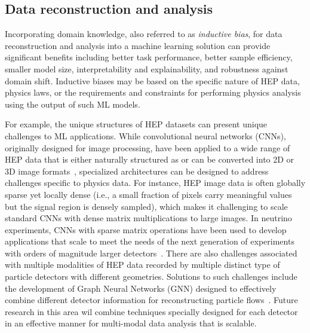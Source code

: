 \documentclass[submission,Phys]{SciPost}
\begin{document}
\subsection{Data reconstruction and analysis}


Incorporating domain knowledge, also referred to as {\it inductive bias}, for data reconstruction and analysis into a machine learning solution can provide significant benefits including better task performance, better sample efficiency, smaller model size, interpretability and explainability, and robustness against domain shift.  Inductive biases may be based on the specific nature of HEP data,  physics laws, or the requirements and constraints for performing physics analysis using the output of such ML models.

For example, the unique structures of HEP datasets can present unique challenges to ML applications. While convolutional neural networks (CNNs), originally designed for image processing, have been applied to a wide range of HEP data that is either naturally structured as or can be converted into 2D or 3D image formats~\cite{Pumplin:1991kc,Cogan:2014oua,Almeida:2015jua,deOliveira:2015xxd,ATL-PHYS-PUB-2017-017,Lin:2018cin,Komiske:2018oaa,Barnard:2016qma,Komiske:2016rsd,Kasieczka:2017nvn,Macaluso:2018tck,li2020reconstructing,li2020attention,Lee:2019cad,collado2021learning,Du:2020pmp,Filipek:2021qbe,Nguyen:2018ugw,ATL-PHYS-PUB-2019-028,Andrews:2018nwy,Chung:2020ysf,Du:2019civ,Andrews:2021ejw,Pol:2021iqw},
specialized architectures can be designed to address challenges specific to physics data. For instance, HEP image data is often globally sparse yet locally dense (i.e., a small fraction of pixels carry meaningful values but the signal region is densely sampled), which makes it challenging to scale standard CNNs with dense matrix multiplications to large images. In neutrino experiments, CNNs with sparse matrix operations have been used to develop applications that scale to meet the needs of the next generation of experiments with orders of magnitude larger detectors~\cite{Abratenko:2020ocq,Domine:2019zhm}.  There are also challenges associated with multiple modalities of HEP data recorded by multiple distinct type of particle detectors with different geometries. Solutions to such challenges include the development of Graph Neural Networks (GNN) designed to effectively combine different detector information for reconstructing particle flows~\cite{Pata:2021oez}. Future research in this area wil combine techniques specially designed for each detector in an effective manner for multi-modal data analysis that is scalable. 
\end{document}
